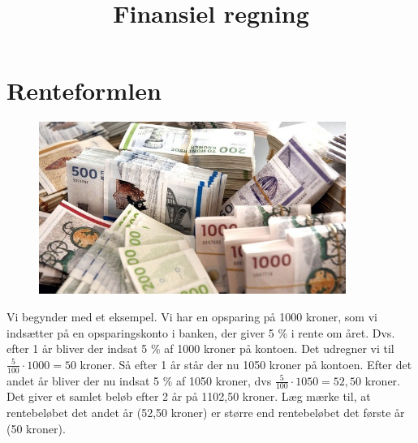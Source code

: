 \documentclass[12pt,oneside,a4paper]{article}
\title{Finansiel regning}
\date{\vspace{-5ex}}
\begin{document}
\maketitle


\section*{Renteformlen}
\begin{figure}[ht]
    \centering
    \includegraphics[width=10cm]{penge}
\end{figure}

Vi begynder med et eksempel. Vi har en opsparing på 1000 kroner, som vi
indsætter på en opsparingskonto i banken, der giver 5 \% i rente om året. Dvs.
efter 1 år bliver der indsat 5 \% af 1000 kroner på kontoen. Det
udregner vi til $ \frac{5}{100} \cdot 1000 = 50 $ kroner. Så efter 1 år står
der nu 1050 kroner på kontoen.  Efter det andet år bliver der nu indsat 5 \% af
1050 kroner, dvs $ \frac{5}{100} \cdot 1050 = 52,50$ kroner.
Det giver et samlet beløb efter 2 år på 1102,50 kroner. Læg mærke til, at
rentebeløbet det andet år (52,50 kroner) er større end rentebeløbet det første
år (50 kroner).
\end{document}
